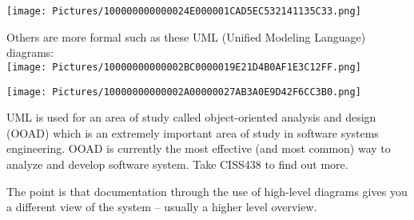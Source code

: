 \documentclass[
]{article}
\begin{document}
\texttt{[image: Pictures/100000000000024E000001CAD5EC532141135C33.png]}

Others are more formal such as these UML (Unified Modeling Language)
diagrams:\\

\texttt{[image: Pictures/10000000000002BC0000019E21D4B0AF1E3C12FF.png]}

\texttt{[image: Pictures/10000000000002A00000027AB3A0E9D42F6CC3B0.png]}

UML is used for an area of study called object-oriented analysis and
design (OOAD) which is an extremely important area of study in software
systems engineering. OOAD is currently the most effective (and most
common) way to analyze and develop software system. Take CISS438 to find
out more.

The point is that documentation through the use of high-level diagrams
gives you a different view of the system -- usually a higher level
overview.
\end{document}
